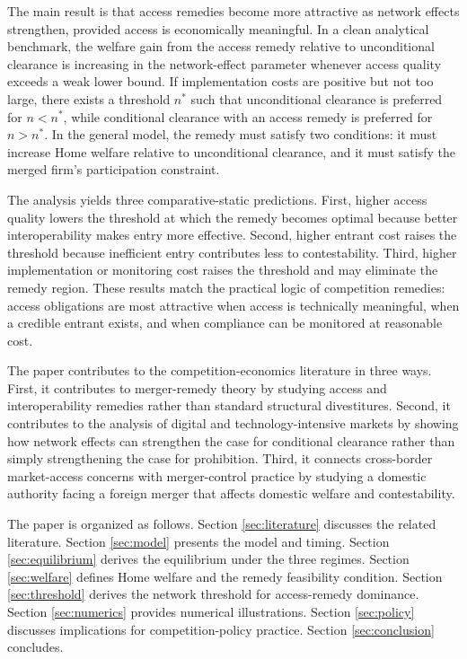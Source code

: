 \documentclass[12pt]{article}
\begin{document}
The main result is that access remedies become more attractive as network effects strengthen, provided access is economically meaningful. In a clean analytical benchmark, the welfare gain from the access remedy relative to unconditional clearance is increasing in the network-effect parameter whenever access quality exceeds a weak lower bound. If implementation costs are positive but not too large, there exists a threshold $n^*$ such that unconditional clearance is preferred for $n<n^*$, while conditional clearance with an access remedy is preferred for $n>n^*$. In the general model, the remedy must satisfy two conditions: it must increase Home welfare relative to unconditional clearance, and it must satisfy the merged firm's participation constraint.

The analysis yields three comparative-static predictions. First, higher access quality lowers the threshold at which the remedy becomes optimal because better interoperability makes entry more effective. Second, higher entrant cost raises the threshold because inefficient entry contributes less to contestability. Third, higher implementation or monitoring cost raises the threshold and may eliminate the remedy region. These results match the practical logic of competition remedies: access obligations are most attractive when access is technically meaningful, when a credible entrant exists, and when compliance can be monitored at reasonable cost.

The paper contributes to the competition-economics literature in three ways. First, it contributes to merger-remedy theory by studying access and interoperability remedies rather than standard structural divestitures. Second, it contributes to the analysis of digital and technology-intensive markets by showing how network effects can strengthen the case for conditional clearance rather than simply strengthening the case for prohibition. Third, it connects cross-border market-access concerns with merger-control practice by studying a domestic authority facing a foreign merger that affects domestic welfare and contestability.

The paper is organized as follows. Section \ref{sec:literature} discusses the related literature. Section \ref{sec:model} presents the model and timing. Section \ref{sec:equilibrium} derives the equilibrium under the three regimes. Section \ref{sec:welfare} defines Home welfare and the remedy feasibility condition. Section \ref{sec:threshold} derives the network threshold for access-remedy dominance. Section \ref{sec:numerics} provides numerical illustrations. Section \ref{sec:policy} discusses implications for competition-policy practice. Section \ref{sec:conclusion} concludes.
\end{document}

